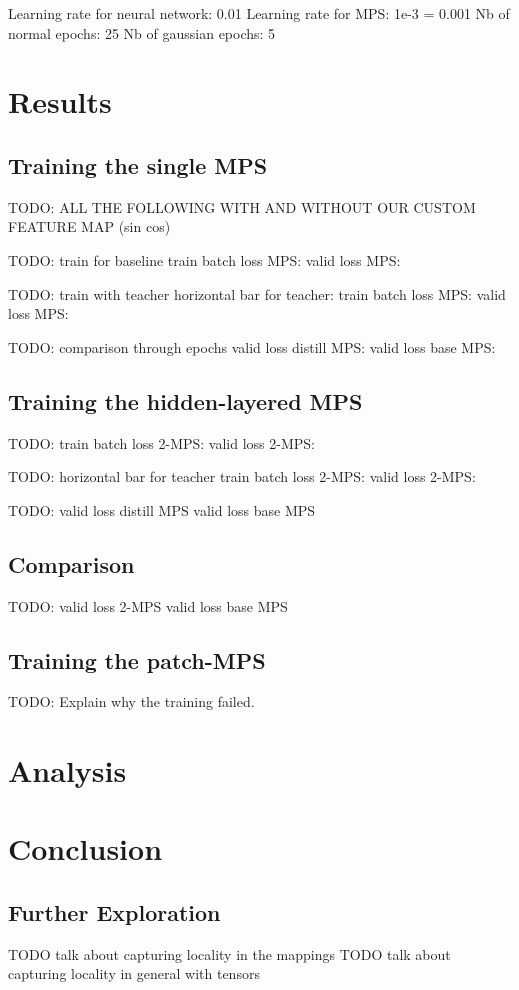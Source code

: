 \documentclass[11pt]{article}
\theoremstyle{definition}
\theoremstyle{definition}
\begin{document}
Learning rate for neural network: 0.01
Learning rate for MPS: 1e-3 = 0.001
Nb of normal epochs: 25
Nb of gaussian epochs: 5


\section{Results}
\subsection{Training the single MPS}
TODO: ALL THE FOLLOWING WITH AND WITHOUT OUR CUSTOM FEATURE MAP (sin cos)

TODO: train for baseline
train batch loss MPS:
valid loss MPS:

TODO: train with teacher
horizontal bar for teacher:
train batch loss MPS:
valid loss MPS:

TODO: comparison through epochs
valid loss distill MPS:
valid loss base MPS:

\subsection{Training the hidden-layered MPS}
TODO: 
train batch loss 2-MPS:
valid loss 2-MPS:




TODO: 
horizontal bar for teacher
train batch loss 2-MPS:
valid loss 2-MPS:

TODO: 
valid loss distill MPS
valid loss base MPS

\subsection{Comparison}
TODO: 
valid loss 2-MPS
valid loss base MPS

\subsection{Training the patch-MPS}
TODO: Explain why the training failed.


\section{Analysis}




\section{Conclusion}



\subsection{Further Exploration}
TODO talk about capturing locality in the mappings
TODO talk about capturing locality in general with tensors

\printbibliography
\end{document}
